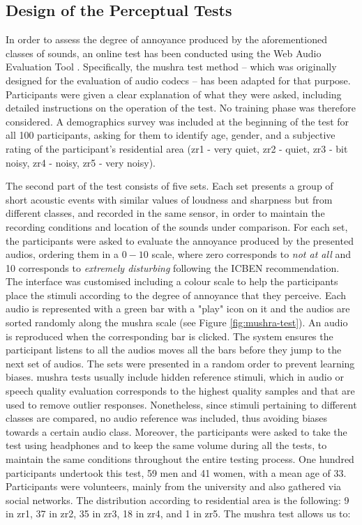  \subsection{Design of the Perceptual Tests}

   In order to assess the degree of annoyance produced by the aforementioned classes of sounds, an online test has been conducted using the Web Audio Evaluation Tool . Specifically, the \gls{mushra} test method  -- which was originally designed for the evaluation of audio codecs -- has been adapted for that purpose. Participants were given a clear explanation of what they were asked, including detailed instructions on the operation of the test. No training phase was therefore considered. A demographics survey was included at the beginning of the test for all 100 participants, asking for them to identify age, gender, and a subjective rating of the participant's residential area (zr1 - very quiet, zr2 - quiet, zr3 - bit noisy, zr4 - noisy, zr5 - very noisy).

   The second part of the test consists of five sets. Each set presents a group of short acoustic events with similar values of loudness and sharpness but from different classes, and recorded in the same sensor, in order to maintain the recording conditions and location of the sounds under comparison. For each set, the participants were asked to evaluate the annoyance produced by the presented audios, ordering them in a $0-10$ scale, where zero corresponds to \emph{not at all} and 10 corresponds to \emph{extremely disturbing} following the ICBEN recommendation. The interface was customised including a colour scale to help the participants place the stimuli according to the degree of annoyance that they perceive. Each audio is represented with a green bar with a "play" icon on it and the audios are sorted randomly along the \gls{mushra} scale (see Figure \ref{fig:mushra-test}). An audio is reproduced when the corresponding bar is clicked. The system ensures the participant listens to all the audios moves all the bars before they jump to the next set of audios. The sets were presented in a random order to prevent learning biases. \gls{mushra} tests usually include hidden reference stimuli, which in audio or speech quality evaluation corresponds to the highest quality samples and that are used to remove outlier responses. Nonetheless, since stimuli pertaining to different classes are compared, no audio reference was included, thus avoiding biases towards a certain audio class. Moreover, the participants were asked to take the test using headphones and to keep the same volume during all the tests, to maintain the same conditions throughout the entire testing process. One hundred participants undertook this test, 59 men and 41 women, with a mean age of 33. Participants were volunteers, mainly from the university and also gathered via social networks. The distribution according to residential area is the following: 9 in zr1, 37 in zr2, 35 in zr3, 18 in zr4, and 1 in zr5. The \gls{mushra} test allows us to:

